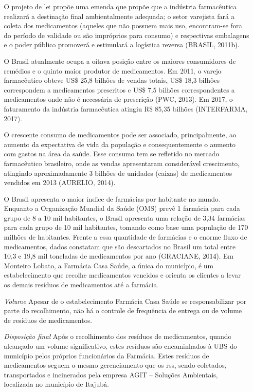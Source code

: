 \begin{description}
	O projeto de lei propõe uma emenda que propõe que a indústria farmacêutica realizará a destinação final ambientalmente adequada; o setor varejista fará a coleta dos medicamentos (aqueles que não possuem mais uso, encontram-se fora do período de validade ou são impróprios para consumo) e respectivas embalagens e o poder público promoverá e estimulará a logística reversa (BRASIL, 2011b).

	O Brasil atualmente ocupa a oitava posição entre os maiores consumidores de remédios e o quinto maior produtor de medicamentos. Em 2011, o varejo farmacêutico obteve US\$ 25,8 bilhões de vendas totais, US\$ 18,3 bilhões correspondem a medicamentos prescritos e US\$ 7,5 bilhões correspondentes a medicamentos onde não é necessária de prescrição (PWC, 2013). Em 2017, o faturamento da indústria farmacêutica atingiu R\$ 85,35 bilhões (INTERFARMA, 2017).
	 
	O crescente consumo de medicamentos pode ser associado, principalmente, ao aumento da expectativa de vida da população e consequentemente o aumento com gastos na área da saúde. Esse consumo tem se refletido no mercado farmacêutico brasileiro, onde as vendas apresentaram considerável crescimento, atingindo aproximadamente 3 bilhões de unidades (caixas) de medicamentos vendidos em 2013 (AURELIO, 2014).
	
	O Brasil apresenta o maior índice de farmácias por habitante no mundo. Enquanto a Organização Mundial da Saúde (OMS) prevê 1 farmácia para cada grupo de 8 a 10 mil habitantes, o Brasil apresenta uma relação de 3,34 farmácias para cada grupo de 10 mil habitantes, tomando como base uma população de 170 milhões de habitantes. Frente a essa quantidade de farmácias e o enorme fluxo de medicamentos, dados constatam que são descartados no Brasil um total entre 10,3 e 19,8 mil toneladas de medicamentos por ano (GRACIANE, 2014).
	Em Monteiro Lobato, a Farmácia Casa Saúde, a única do município, é um estabelecimento que recolhe medicamentos vencidos e orienta os clientes a levar os demais resíduos de medicamentos até a farmácia.
	
	\subitem \textit{Volume}
	Apesar de o estabelecimento Farmácia Casa Saúde se responsabilizar por parte do recolhimento, não há o controle de frequência de entrega ou de volume de resíduos de medicamentos.
	
	\subitem \textit{Disposição final}
	Após o recolhimento dos resíduos de medicamentos, quando alcançado um volume significativo, estes resíduos são encaminhados à UBS do município pelos próprios funcionários da Farmácia.
	Estes resíduos de medicamentos seguem o mesmo gerenciamento que os \gls{rss}, sendo coletados, transportados e incinerados pela empresa AGIT – Soluções Ambientais, localizada no município de Itajubá.
			
\end{description}

